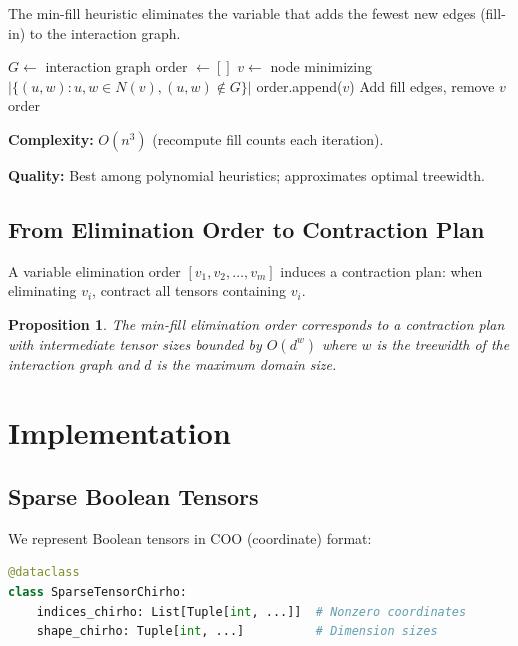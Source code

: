 \documentclass[11pt,a4paper]{article}
\newtheorem{proposition}[theorem]{Proposition}
\begin{document}
The min-fill heuristic eliminates the variable that adds the fewest new edges (fill-in)
to the interaction graph.

\begin{algorithm}[ht]
\caption{Min-Fill Variable Elimination}
\label{alg:min_fill_chirho}
\begin{algorithmic}[1]
\State $G \gets$ interaction graph
\State order $\gets []$
  \State $v \gets$ node minimizing $|\{(u,w) : u,w \in N(v), (u,w) \notin G\}|$
  \State order.append($v$)
  \State Add fill edges, remove $v$
\EndWhile
\State \Return order
\end{algorithmic}
\end{algorithm}

\textbf{Complexity:} $O(n^3)$ (recompute fill counts each iteration).

\textbf{Quality:} Best among polynomial heuristics; approximates optimal treewidth.

\subsection{From Elimination Order to Contraction Plan}

A variable elimination order $[v_1, v_2, \ldots, v_m]$ induces a contraction plan:
when eliminating $v_i$, contract all tensors containing $v_i$.

\begin{proposition}
The min-fill elimination order corresponds to a contraction plan with intermediate
tensor sizes bounded by $O(d^w)$ where $w$ is the treewidth of the interaction graph
and $d$ is the maximum domain size.
\end{proposition}

\section{Implementation}
\label{sec:implementation_chirho}

\subsection{Sparse Boolean Tensors}

We represent Boolean tensors in COO (coordinate) format:
\begin{lstlisting}[language=Python]
@dataclass
class SparseTensorChirho:
    indices_chirho: List[Tuple[int, ...]]  # Nonzero coordinates
    shape_chirho: Tuple[int, ...]          # Dimension sizes
\end{lstlisting}
\end{document}
